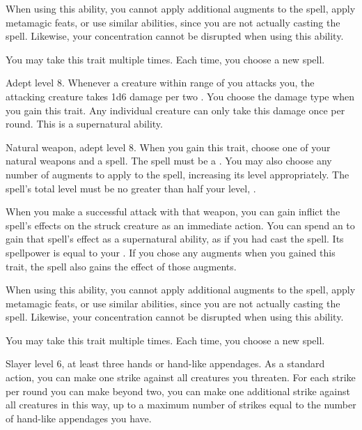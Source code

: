     When using this ability, you cannot apply additional augments to the spell, apply metamagic feats, or use similar abilities, since you are not actually casting the spell.
    Likewise, your concentration cannot be disrupted when using this ability.

     You may take this trait multiple times.
    Each time, you choose a new spell.

    \featpre Adept level 8.
    \featben Whenever a creature within \rngmed range of you attacks you, the attacking creature takes 1d6 damage per two .
    You choose the damage type when you gain this trait.
    Any individual creature can only take this damage once per round.
    This is a supernatural ability.

    \featpres Natural weapon, adept level 8.
    \featben When you gain this trait, choose one of your natural weapons and a spell.
    The spell must be a .
    You may also choose any number of augments to apply to the spell, increasing its level appropriately.
    The spell's total level must be no greater than half your level, .

    When you make a successful attack with that weapon, you can gain inflict the spell's effects on the struck creature as an immediate action.
    You can spend an  to gain that spell's effect as a supernatural ability, as if you had cast the spell.
    Its spellpower is equal to your .
    If you chose any augments when you gained this trait, the spell also gains the effect of those augments.

    When using this ability, you cannot apply additional augments to the spell, apply metamagic feats, or use similar abilities, since you are not actually casting the spell.
    Likewise, your concentration cannot be disrupted when using this ability.

     You may take this trait multiple times.
    Each time, you choose a new spell.

    \featpres Slayer level 6, at least three hands or hand-like appendages.
    \featben As a standard action, you can make one strike against all creatures you threaten.
    For each strike per round you can make beyond two, you can make one additional strike against all creatures in this way, up to a maximum number of strikes equal to the number of hand-like appendages you have.

